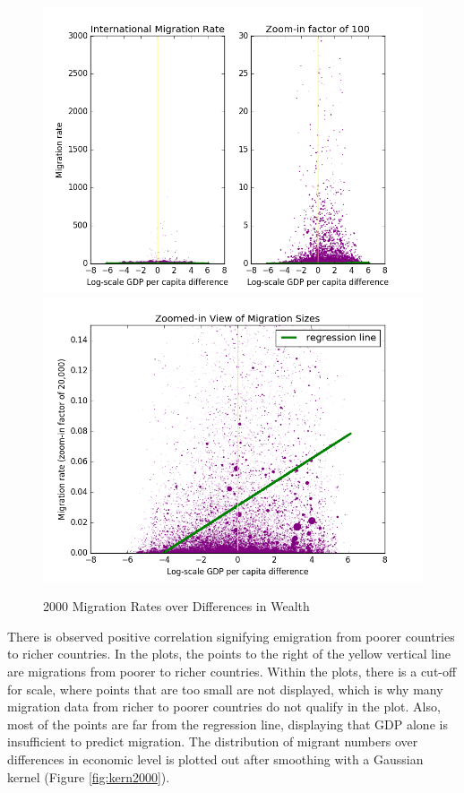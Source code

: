 \documentclass{acm_proc_article-sp}
\begin{document}
\begin{figure}[h]
    \includegraphics[width=\columnwidth, keepaspectratio=true]{GDP_regression_2000.png}
    \includegraphics[width=\columnwidth, keepaspectratio=true]{GDP_regression_zoom_2000.png}
    \caption{2000 Migration Rates over Differences in Wealth}
    \label{fig:reg2000}
\end{figure}

There is observed positive correlation signifying emigration from poorer countries to richer countries. In the plots, the points to the right of the yellow vertical line are migrations from poorer to richer countries. Within the plots, there is a cut-off for scale, where points that are too small are not displayed, which is why many migration data from richer to poorer countries do not qualify in the plot. Also, most of the points are far from the regression line, displaying that GDP alone is insufficient to predict migration. The distribution of migrant numbers over differences in economic level is plotted out after smoothing with a Gaussian kernel (Figure \ref{fig:kern2000}). 
\end{document}
